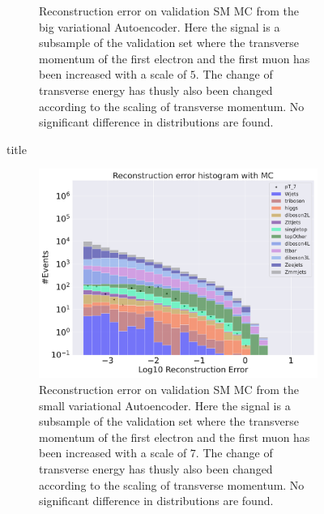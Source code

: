 \begin{figure}[h!]
\begin{subfigure}{.45\textwidth}
        \caption{Reconstruction error on validation SM MC from the big variational Autoencoder. Here the signal is a subsample of the validation 
        set where the transverse momentum of the first electron and the first muon has been increased with a scale of $5$. The change of transverse 
        energy has thusly also been changed according to the scaling of transverse momentum. No significant difference in distributions are found. }
        \label{fig:ae_big_pt_5}
    \end{subfigure}
    \hfill 
    \caption{title}
    \label{fig:ae_big_small_pt_5}
\end{figure}


\begin{figure}[h!]
    \centering
    \begin{subfigure}{.45\textwidth}
        \includegraphics[width=\textwidth]{Figures/AE_testing/small/b_data_recon_big_rm3_feats_sig_pT_7.pdf}
        \caption{Reconstruction error on validation SM MC from the small variational Autoencoder. Here the signal is a subsample of the validation 
        set where the transverse momentum of the first electron and the first muon has been increased with a scale of $7$. The change of transverse 
        energy has thusly also been changed according to the scaling of transverse momentum. No significant difference in distributions are found. }
        \label{fig:ae_small_pt_7}
    \end{subfigure}
    \hfill 
    \begin{subfigure}{.45\textwidth}

\end{subfigure}
\end{figure}
